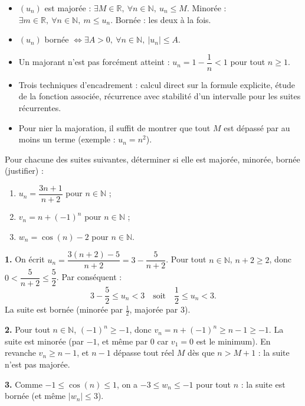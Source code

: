 \documentclass[11pt]{article}
\newcommand{\cle}[1]{{\popxbold\color{popdark}#1}}
\begin{document}
\begin{aretenir}
\begin{itemize}
\item $(u_n)$ est \cle{majorée} : $\exists M \in \mathbb{R},\ \forall n \in \mathbb{N},\ u_n \le M$. \cle{Minorée} : $\exists m \in \mathbb{R},\ \forall n \in \mathbb{N},\ m \le u_n$. \cle{Bornée} : les deux à la fois.
\item $(u_n)$ bornée $\iff \exists A > 0,\ \forall n \in \mathbb{N},\ |u_n| \le A$.
\item Un majorant n'est pas forcément atteint : $u_n = 1 - \dfrac{1}{n} < 1$ pour tout $n \ge 1$.
\item Trois techniques d'encadrement : calcul direct sur la formule explicite, étude de la fonction associée, récurrence avec stabilité d'un intervalle pour les suites récurrentes.
\item Pour nier la majoration, il suffit de montrer que tout $M$ est dépassé par au moins un terme (exemple : $u_n = n^2$).
\end{itemize}
\end{aretenir}

\begin{exercice}
Pour chacune des suites suivantes, déterminer si elle est majorée, minorée, bornée (justifier) :
\begin{enumerate}
\item $u_n = \dfrac{3n + 1}{n + 2}$ pour $n \in \mathbb{N}$ ;
\item $v_n = n + (-1)^n$ pour $n \in \mathbb{N}$ ;
\item $w_n = \cos(n) - 2$ pour $n \in \mathbb{N}$.
\end{enumerate}
\end{exercice}

\begin{corrige}
\textbf{1.} On écrit $u_n = \dfrac{3(n+2) - 5}{n+2} = 3 - \dfrac{5}{n+2}$. Pour tout $n \in \mathbb{N}$, $n+2 \ge 2$, donc $0 < \dfrac{5}{n+2} \le \dfrac{5}{2}$. Par conséquent :
\[ 3 - \frac{5}{2} \le u_n < 3 \quad \text{soit} \quad \frac{1}{2} \le u_n < 3. \]
La suite est bornée (minorée par $\frac{1}{2}$, majorée par $3$).

\textbf{2.} Pour tout $n \in \mathbb{N}$, $(-1)^n \ge -1$, donc $v_n = n + (-1)^n \ge n - 1 \ge -1$. La suite est minorée (par $-1$, et même par $0$ car $v_1=0$ est le minimum). En revanche $v_n \ge n - 1$, et $n - 1$ dépasse tout réel $M$ dès que $n > M + 1$ : la suite n'est pas majorée.

\textbf{3.} Comme $-1 \le \cos(n) \le 1$, on a $-3 \le w_n \le -1$ pour tout $n$ : la suite est bornée (et même $|w_n| \le 3$).
\end{corrige}
\end{document}

